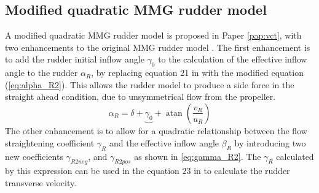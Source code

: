 \subsection{Modified quadratic MMG rudder model}
A modified quadratic MMG rudder model is proposed in Paper \ref{pap:vct}, with two enhancements to the original MMG rudder model \cite{yasukawaIntroductionMMGStandard2015}. The first enhancement is to add the rudder initial inflow angle $\gamma_0$ to the calculation of the effective inflow angle to the rudder $\alpha_R$, by replacing equation 21 in \textcite{yasukawaIntroductionMMGStandard2015} with the modified equation (\autoref{eq:alpha_R2}). This allows the rudder model to produce a side force in the straight ahead condition, due to unsymmetrical flow from the propeller. 
\begin{equation}
    \label{eq:alpha_R2}
    \alpha_{R} = \delta + \underbrace{\gamma_{0}}_{~} + \operatorname{atan}{\left(\frac{v_{R}}{u_{R}} \right)}
\end{equation}
The other enhancement is to allow for a quadratic relationship between the flow straightening coefficient $\gamma_R$ and the effective inflow angle $\beta_R$ by introducing two new coefficients $\gamma_{R2neg}$, and $\gamma_{R2pos}$ as shown in \autoref{eq:gamma_R2}. The $\gamma_R$ calculated by this expression can be used in the equation 23 in \textcite{yasukawaIntroductionMMGStandard2015} to calculate the rudder transverse velocity.  
\begin{equation}
    \label{eq:gamma_R2}
    
\end{equation}
\clearpage